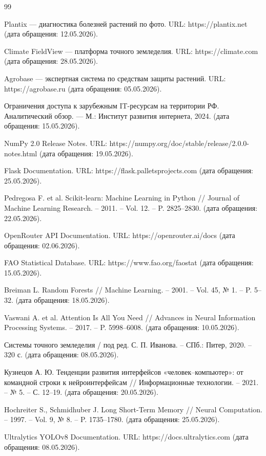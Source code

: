\documentclass[14pt, a4paper]{extarticle}
\begin{document}
\newpage
\renewcommand\refname{\centering Список использованных источников}
\clearpage
{}
\begin{thebibliography}{99}

Plantix — диагностика болезней растений по фото. URL: https://plantix.net (дата обращения: 12.05.2026).

Climate FieldView — платформа точного земледелия. URL: https://climate.com (дата обращения: 28.05.2026).

Agrobase — экспертная система по средствам защиты растений. URL: https://agrobase.ru (дата обращения: 05.05.2026).

Ограничения доступа к зарубежным IT-ресурсам на территории РФ. Аналитический обзор. — М.: Институт развития интернета, 2024. (дата обращения: 15.05.2026).

NumPy 2.0 Release Notes. URL: https://numpy.org/doc/stable/release/2.0.0-notes.html (дата обращения: 19.05.2026).

Flask Documentation. URL: https://flask.palletsprojects.com (дата обращения: 25.05.2026).

Pedregosa F. et al. Scikit-learn: Machine Learning in Python // Journal of Machine Learning Research. – 2011. – Vol. 12. – P. 2825–2830. (дата обращения: 22.05.2026).

OpenRouter API Documentation. URL: https://openrouter.ai/docs (дата обращения: 02.06.2026).

FAO Statistical Database. URL: https://www.fao.org/faostat (дата обращения: 15.05.2026).

Breiman L. Random Forests // Machine Learning. – 2001. – Vol. 45, № 1. – P. 5–32. (дата обращения: 18.05.2026).

Vaswani A. et al. Attention Is All You Need // Advances in Neural Information Processing Systems. – 2017. – P. 5998–6008. (дата обращения: 10.05.2026).

Системы точного земледелия / под ред. С. П. Иванова. – СПб.: Питер, 2020. – 320 с. (дата обращения: 08.05.2026).

Кузнецов А. Ю. Тенденции развития интерфейсов «человек–компьютер»: от командной строки к нейроинтерфейсам // Информационные технологии. – 2021. – № 5. – С. 12–19. (дата обращения: 20.05.2026).

Hochreiter S., Schmidhuber J. Long Short-Term Memory // Neural Computation. – 1997. – Vol. 9, № 8. – P. 1735–1780. (дата обращения: 25.05.2026).

Ultralytics YOLOv8 Documentation. URL: https://docs.ultralytics.com (дата обращения: 08.05.2026).

\end{thebibliography}
\end{document}
